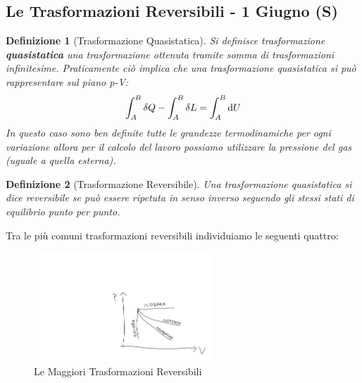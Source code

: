 \documentclass{article}
\newtheorem{defn}{Definizione}[section]
\begin{document}
\subsection{Le Trasformazioni Reversibili - 1 Giugno (S)}
\begin{defn}[Trasformazione Quasistatica]
Si definisce trasformazione \textbf{quasistatica} una trasformazione ottenuta tramite somma di trasformazioni infinitesime. Praticamente ciò implica che una trasformazione quasistatica si può rappresentare sul piano p-V:
\[\int_A^B\delta Q-\int_A^B\delta L=\int_A^B\dif U\]
In questo caso sono ben definite tutte le grandezze termodinamiche per ogni variazione allora per il calcolo del lavoro possiamo utilizzare la pressione del gas (uguale a quella esterna). 
\end{defn}
\begin{defn}[Trasformazione Reversibile]
Una trasformazione quasistatica si dice reversibile se può essere ripetuta in senso inverso seguendo gli stessi stati di equilibrio punto per punto. 
\end{defn}
Tra le più comuni trasformazioni reversibili individuiamo le seguenti quattro:
\begin{figure}[H]
    \centering
    \includegraphics[width=0.6\textwidth]{TrasformazioniReversibili.png}
    \caption{Le Maggiori Trasformazioni Reversibili }
    \label{TrasfRevers}
\end{figure}
\end{document}

